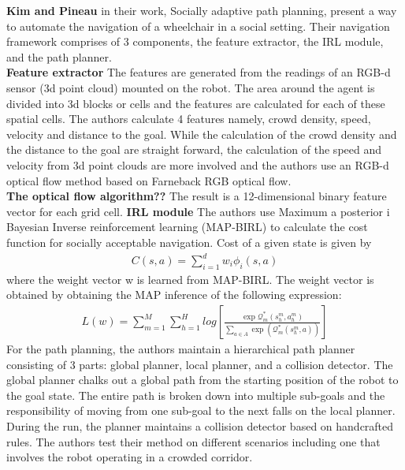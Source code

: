 \textbf{Kim and Pineau} in their work, Socially adaptive path planning, present a way to automate the navigation of a wheelchair in a social setting. Their navigation framework comprises of 3 components, the feature extractor, the IRL module, and the path planner.\\
\textbf{Feature extractor}
The features are generated from the readings of an RGB-d sensor (3d point cloud) mounted on the robot. The area around the agent is divided into 3d blocks or cells and the features are calculated for each of these spatial cells. 
The authors calculate 4 features namely,
crowd density, speed, velocity and distance to the goal.
While the calculation of the crowd density and the distance to the goal are straight forward, the calculation of the speed and velocity from 3d point clouds are more involved and the authors use an RGB-d optical flow method based on Farneback RGB optical flow. 
\\ \textbf{The optical flow algorithm??}
The result is a 12-dimensional binary feature vector for each grid cell.
\textbf{IRL module}
The authors use Maximum a posterior i Bayesian Inverse reinforcement learning (MAP-BIRL) to calculate the cost function for socially acceptable navigation. Cost of a given state is given by
\begin{align}
C(s,a) = \sum^{d}_{i=1} w_i \phi_i(s,a)
\end{align}
where the weight vector w is learned from MAP-BIRL. 
The weight vector is obtained by obtaining the MAP inference of the following expression:
\begin{align}
L(w) = \sum^M_{m=1} \sum^{H}_{h=1}log[\frac{\exp \mathcal{Q}^{*}_m(s^m_h, a^m_h)}{\sum_{a\in A} \exp(\mathcal{Q}_m^*(s_h^m,a))}]
\end{align}
For the path planning, the authors maintain a hierarchical path planner consisting of 3 parts: global planner, local planner, and a collision detector.
The global planner chalks out a global path from the starting position of the robot to the goal state. The entire path is broken down into multiple sub-goals and the responsibility of moving from one sub-goal to the next falls on the local planner. During the run, the planner maintains a collision detector based on handcrafted rules.
The authors test their method on different scenarios including one that involves the robot operating in a crowded corridor.\\

